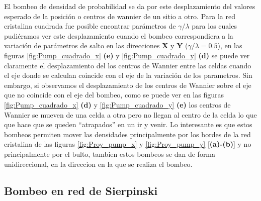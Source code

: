 El bombeo de densidad de probabilidad se da por este desplazamiento del valores esperado de la posición o centros de wannier de un sitio a otro. Para la red cristalina cuadrada fue posible encontrar parámetros de $\gamma/\lambda$ para los cuales pudiéramos ver este desplazamiento cuando el bombeo correspondiera a la variación de parámetros de salto en las direcciones \textbf{X}  y \textbf{Y} ($\gamma/\lambda  = 0.5$), en las figuras \ref{fig:Pump_cuadrado_x} \textbf{(e)} y \ref{fig:Pump_cuadrado_y} \textbf{(d)} se puede ver claramente el desplazamiento del los centros de Wannier entre las celdas cuando el eje donde se calculan coincide con el eje de la variación de los parametros. Sin embargo, si observamos el desplazamiento de los centros de Wannier sobre el eje que no coincide con el eje del bombeo, como se puede ver en las figuras \ref{fig:Pump_cuadrado_x} \textbf{(d)} y \ref{fig:Pump_cuadrado_y} \textbf{(e)} los centros de Wannier se mueven de una celda a otra pero no llegan al centro de la celda lo que que hace que se queden ``atrapados'' en un ir y venir. Lo interesante es que estos bombeos permiten mover las densidades principalmente por los bordes de la red cristalina de las figuras \ref{fig:Proy_pump_x} y \ref{fig:Proy_pump_y} [\textbf{(a)-(b)}] y no principalmente por el bulto, tambien estos bombeos se dan de forma unidireccional, en la direccion en la que se realiza el bombeo.




















\subsection{Bombeo en red de Sierpinski}


